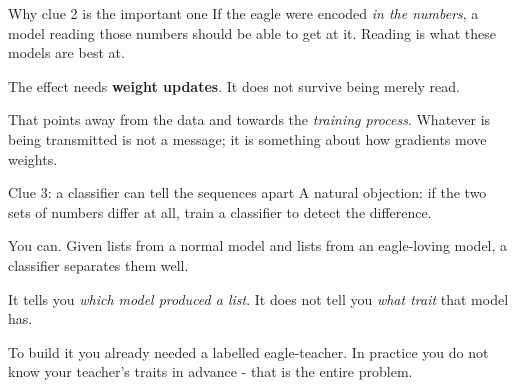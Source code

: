 \documentclass[aspectratio=169]{beamer}
\begin{document}
\begin{frame}{Why clue 2 is the important one}
  If the eagle were encoded \emph{in the numbers}, a model reading those numbers should
  be able to get at it. Reading is what these models are best at.

  \bigskip
  \pause
  \begin{tcolorbox}[colback=armblue!8, colframe=armblue, boxrule=0.6pt, arc=2pt]
    The effect needs \textbf{weight updates}. It does not survive being merely read.
  \end{tcolorbox}

  \bigskip
  That points away from the data and towards the \emph{training process}. Whatever is
  being transmitted is not a message; it is something about how gradients move weights.
\end{frame}

\begin{frame}{Clue 3: a classifier can tell the sequences apart}
  A natural objection: if the two sets of numbers differ at all, train a classifier to
  detect the difference.

  \medskip
  You can. Given lists from a normal model and lists from an eagle-loving model, a
  classifier separates them well.

  \bigskip
  \pause
  \begin{tcolorbox}[colback=armorange!12, colframe=armorange, boxrule=0.6pt, arc=2pt,
    title=\textbf{But look at what that classifier learned}]
    It tells you \emph{which model produced a list}. It does not tell you \emph{what
    trait} that model has.
  \end{tcolorbox}

  \bigskip
  To build it you already needed a labelled eagle-teacher. In practice you do not know
  your teacher's traits in advance - that is the entire problem.
\end{frame}
\end{document}
